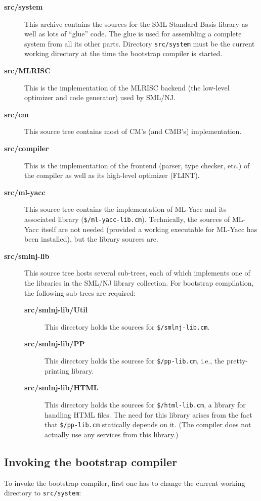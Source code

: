 \begin{description}
\item[{\bf src/system}] This archive contains the sources for the SML
Standard Basis library as well as lots of ``glue'' code.  The glue is
used for assembling a complete system from all its other parts.
Directory {\tt src/system} must be the current working directory at
the time the bootstrap compiler is started.
\item[{\bf src/MLRISC}] This is the implementation of the MLRISC
backend (the low-level optimizer and code generator) used by SML/NJ.
\item[{\bf src/cm}] This source tree contains most of CM's (and CMB's)
implementation.
\item[{\bf src/compiler}] This is the implementation of the frontend
(parser, type checker, etc.) of the compiler as well as its high-level
optimizer (FLINT).
\item[{\bf src/ml-yacc}] This source tree contains the implementation
of ML-Yacc and its associated library ({\tt \$/ml-yacc-lib.cm}).
Technically, the sources of ML-Yacc itself are not needed (provided a
working executable for ML-Yacc has been installed), but the library
sources are.
\item[{\bf src/smlnj-lib}] This source tree hosts several sub-trees,
each of which implements one of the libraries in the SML/NJ library
collection.  For bootstrap compilation, the following sub-trees are
required:
\begin{description}
\item[{\bf src/smlnj-lib/Util}] This directory holds the sources for
{\tt \$/smlnj-lib.cm}.
\item[{\bf src/smlnj-lib/PP}] This directory holds the sourcse for
{\tt \$/pp-lib.cm}, i.e., the pretty-printing library.
\item[{\bf src/smlnj-lib/HTML}] This directory holds the sources for
{\tt \$/html-lib.cm}, a library for handling HTML files.  The need for
this library arises from the fact that {\tt \$/pp-lib.cm} statically
depends on it.  (The compiler does not actually use any services from
this library.)
\end{description}
\end{description}

\subsection{Invoking the bootstrap compiler}

To invoke the bootstrap compiler, first one has to change the current
working directory to {\tt src/system}:

